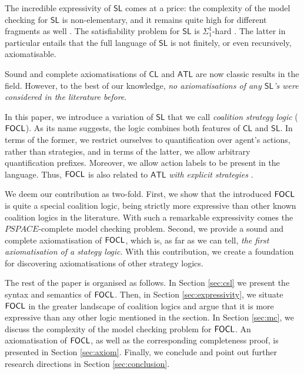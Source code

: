 \documentclass[sigconf,anonymous]{aamas}
\begin{document}
The incredible expressivity of $\mathsf{SL}$ comes at a price: the complexity of the model checking for $\mathsf{SL}$ is non-elementary, and it remains quite high for different fragments as well \cite{mogavero14}. The satisfiability problem for $\mathsf{SL}$ is $\Sigma^1_1$-hard \cite{mogavero16}. The latter in particular entails that the full language of $\mathsf{SL}$ is not finitely, or even recursively, axiomatisable.

Sound and complete axiomatisations of $\mathsf{CL}$ \cite{pauly02,goranko13} and $\mathsf{ATL}$ \cite{goranko06} are now classic results in the field. However, to the best of our knowledge, \textit{no axiomatisations of any $\mathsf{SL}$'s were considered in the literature before}. 

In this paper, we introduce a variation of $\mathsf{SL}$ that we call \textit{coalition strategy logic} ($\mathsf{FOCL}$). As its name suggests, the logic combines both features of $\mathsf{CL}$ and $\mathsf{SL}$. In terms of the former, we restrict ourselves to quantification over agent's actions, rather than strategies, and in terms of the latter, we allow arbitrary quantification prefixes. Moreover, 
we %
allow action labels to be %
present in the language. Thus, $\mathsf{FOCL}$ is also related to $\mathsf{ATL}$ \textit{with explicit strategies} \cite{walther07}.%

We deem our contribution as two-fold. First, we show that the introduced $\mathsf{FOCL}$ is quite a special coalition logic, being strictly more expressive than other known coalition logics in the literature. With such a remarkable expressivity comes the $\mathit{PSPACE}$-complete model checking problem. Second, we provide a sound and complete axiomatisation of $\mathsf{FOCL}$, which is, as far as we can tell, \textit{the first axiomatisation of a stategy logic}. With this contribution, we create a foundation for discovering axiomatisations of other strategy logics.  

The rest of the paper is organised as follows. In Section \ref{sec:csl} we present the syntax and semantics of $\mathsf{FOCL}$. Then, in Section \ref{sec:expressivity}, we situate $\mathsf{FOCL}$ in the greater landscape of coalition logics and argue that it is more expressive than any other logic mentioned in the section. In Section \ref{sec:mc}, we discuss the complexity of the model checking problem for $\mathsf{FOCL}$. An axiomatisation of $\mathsf{FOCL}$, as well as the 
corresponding completeness proof, %
is presented in Section \ref{sec:axiom}. Finally, we conclude and point out further research directions in Section \ref{sec:conclusion}.
\end{document}
